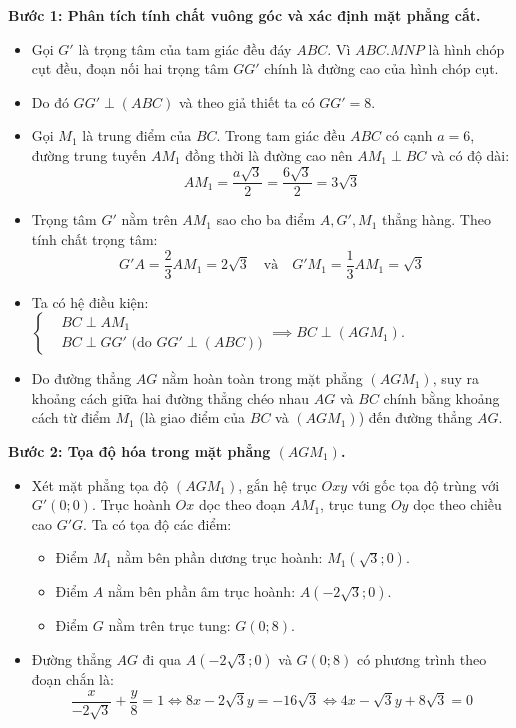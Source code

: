 \documentclass[12pt,a4paper]{article}
\newcommand{\heva}[1]{\left\{\begin{aligned}#1\end{aligned}\right.}
\begin{document}
\begin{ex}
{\begin{apdungbox}
\begin{center}
\end{center}

\textbf{Bước 1: Phân tích tính chất vuông góc và xác định mặt phẳng cắt.}
\begin{itemize}
    \item Gọi $G'$ là trọng tâm của tam giác đều đáy $ABC$. Vì $ABC.MNP$ là hình chóp cụt đều, đoạn nối hai trọng tâm $GG'$ chính là đường cao của hình chóp cụt. 
    \item Do đó $GG' \perp (ABC)$ và theo giả thiết ta có $GG' = 8$.
    \item Gọi $M_1$ là trung điểm của $BC$. Trong tam giác đều $ABC$ có cạnh $a=6$, đường trung tuyến $AM_1$ đồng thời là đường cao nên $AM_1 \perp BC$ và có độ dài:
    \[ AM_1 = \dfrac{a\sqrt{3}}{2} = \dfrac{6\sqrt{3}}{2} = 3\sqrt{3} \]
    \item Trọng tâm $G'$ nằm trên $AM_1$ sao cho ba điểm $A, G', M_1$ thẳng hàng. Theo tính chất trọng tâm:
    \[ G'A = \dfrac{2}{3} AM_1 = 2\sqrt{3} \quad \text{và} \quad G'M_1 = \dfrac{1}{3} AM_1 = \sqrt{3} \]
    \item Ta có hệ điều kiện: $\heva{& BC \perp AM_1 \\ & BC \perp GG' \text{ (do } GG' \perp (ABC))} \implies BC \perp (AGM_1)$.
    \item Do đường thẳng $AG$ nằm hoàn toàn trong mặt phẳng $(AGM_1)$, suy ra khoảng cách giữa hai đường thẳng chéo nhau $AG$ và $BC$ chính bằng khoảng cách từ điểm $M_1$ (là giao điểm của $BC$ và $(AGM_1)$) đến đường thẳng $AG$.
\end{itemize}

\textbf{Bước 2: Tọa độ hóa trong mặt phẳng $(AGM_1)$.}
\begin{itemize}
    \item Xét mặt phẳng tọa độ $(AGM_1)$, gắn hệ trục $Oxy$ với gốc tọa độ trùng với $G'(0;0)$. Trục hoành $Ox$ dọc theo đoạn $AM_1$, trục tung $Oy$ dọc theo chiều cao $G'G$. Ta có tọa độ các điểm:
    \begin{itemize}
        \item Điểm $M_1$ nằm bên phần dương trục hoành: $M_1(\sqrt{3}; 0)$.
        \item Điểm $A$ nằm bên phần âm trục hoành: $A(-2\sqrt{3}; 0)$.
        \item Điểm $G$ nằm trên trục tung: $G(0; 8)$.
    \end{itemize}
    \item Đường thẳng $AG$ đi qua $A(-2\sqrt{3}; 0)$ và $G(0; 8)$ có phương trình theo đoạn chắn là:
    \[ \dfrac{x}{-2\sqrt{3}} + \dfrac{y}{8} = 1 \Leftrightarrow 8x - 2\sqrt{3}y = -16\sqrt{3} \Leftrightarrow 4x - \sqrt{3}y + 8\sqrt{3} = 0 \]
\end{itemize}


\end{apdungbox}}
\end{ex}
\end{document}
